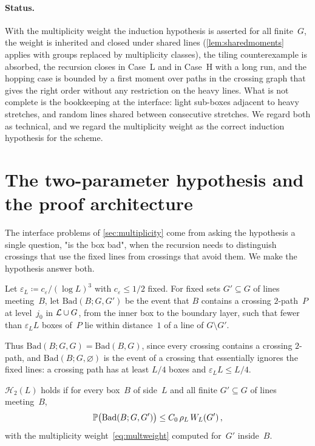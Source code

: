 \documentclass[11pt,letterpaper]{article}
\newcommand{\Bad}{\mathrm{Bad}}
\begin{document}
\paragraph{Status.} With the multiplicity weight the induction hypothesis is asserted for all finite~$G$, the weight is inherited and closed under shared lines (\cref{lem:sharedmoments} applies with groups replaced by multiplicity classes), the tiling counterexample is absorbed, the recursion closes in Case~L and in Case~H with a long run, and the hopping case is bounded by a first moment over paths in the crossing graph that gives the right order without any restriction on the heavy lines. What is not complete is the bookkeeping at the interface: light sub-boxes adjacent to heavy stretches, and random lines shared between consecutive stretches. We regard both as technical, and we regard the multiplicity weight as the correct induction hypothesis for the scheme.

\section{The two-parameter hypothesis and the proof architecture}
\label{sec:architecture}

The interface problems of \cref{sec:multiplicity} come from asking the hypothesis a single question, "is the box bad", when the recursion needs to distinguish crossings that use the fixed lines from crossings that avoid them. We make the hypothesis answer both.

\begin{definition}
\label{def:avoid}
Let $\varepsilon_L\coloneqq c_\varepsilon/(\log L)^3$ with $c_\varepsilon\le1/2$ fixed. For fixed sets $G'\subseteq G$ of lines meeting~$B$, let $\Bad(B;G,G')$ be the event that $B$ contains a crossing $2$-path~$P$ at level~$j_0$ in $\mathcal L\cup G$, from the inner box to the boundary layer, such that fewer than $\varepsilon_LL$ boxes of~$P$ lie within distance~$1$ of a line of $G\setminus G'$.
\end{definition}

Thus $\Bad(B;G,G)=\Bad(B,G)$, since every crossing contains a crossing $2$-path, and $\Bad(B;G,\varnothing)$ is the event of a crossing that essentially ignores the fixed lines: a crossing path has at least $L/4$ boxes and $\varepsilon_LL\le L/4$.

\begin{definition}
\label{def:H2}
$\mathcal H_2(L)$ holds if for every box~$B$ of side~$L$ and all finite $G'\subseteq G$ of lines meeting~$B$,
\begin{equation}
\label{eq:H2}
  \P\bigl(\Bad(B;G,G')\bigr)\le C_0\,\rho_L\,W_L(G')\,,
\end{equation}
with the multiplicity weight~\eqref{eq:multweight} computed for~$G'$ inside~$B$.
\end{definition}
\end{document}
